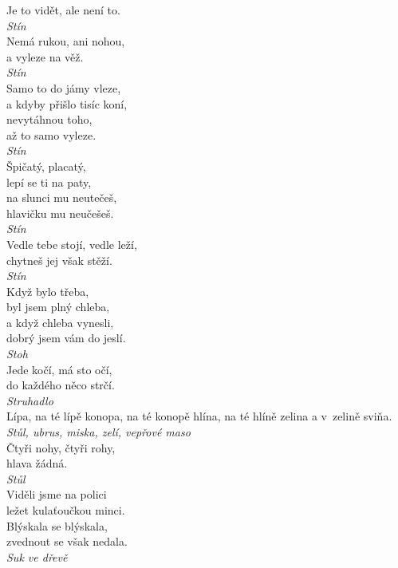\begin{multicols}{4}
\noindent
Je to vidět, ale není to.\\[1 mm]
{\sl Stín}\\

\noindent
Nemá rukou, ani nohou,\\
a vyleze na věž.\\[1 mm]
{\sl Stín}\\

\noindent
Samo to do jámy vleze,\\
a kdyby přišlo tisíc koní,\\
nevytáhnou toho,\\
až to samo vyleze.\\[1 mm]
{\sl Stín}\\

\noindent
Špičatý, placatý,\\
lepí se ti na paty,\\
na slunci mu neutečeš,\\
hlavičku mu neučešeš.\\[1 mm]
{\sl Stín}\\

\noindent
Vedle tebe stojí, vedle leží,\\
chytneš jej však stěží.\\[1 mm]
{\sl Stín}\\

\noindent
Když bylo třeba,\\
byl jsem plný chleba,\\
a když chleba vynesli,\\
dobrý jsem vám do jeslí.\\[1 mm]
{\sl Stoh}\\

\noindent
Jede kočí, má sto očí,\\
do každého něco strčí.\\[1 mm]
{\sl Struhadlo}\\

\noindent
Lípa, na té lípě konopa, na té konopě hlína, na té hlíně
zelina a v~zelině sviňa.\\[1 mm]
{\sl Stůl, ubrus, miska, zelí, vepřové maso}\\

\noindent
Čtyři nohy, čtyři rohy,\\
hlava žádná.\\[1 mm]
{\sl Stůl}\\

\noindent
Viděli jsme na polici\\
ležet kulaťoučkou minci.\\
Blýskala se blýskala,\\
zvednout se však nedala.\\[1 mm]
{\sl Suk ve dřevě}\\


\end{multicols}
